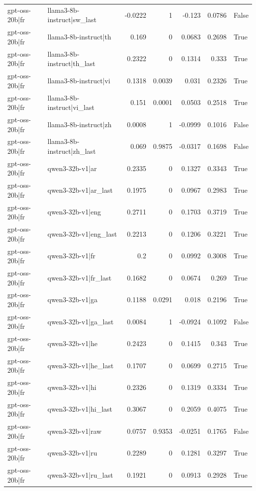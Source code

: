\begin{table}
\begin{tabular}{l l r r r r l}
gpt-oss-20b|fr & llama3-8b-instruct|sw_last & -0.0222 & 1 & -0.123 & 0.0786 & False \\
gpt-oss-20b|fr & llama3-8b-instruct|th & 0.169 & 0 & 0.0683 & 0.2698 & True \\
gpt-oss-20b|fr & llama3-8b-instruct|th_last & 0.2322 & 0 & 0.1314 & 0.333 & True \\
gpt-oss-20b|fr & llama3-8b-instruct|vi & 0.1318 & 0.0039 & 0.031 & 0.2326 & True \\
gpt-oss-20b|fr & llama3-8b-instruct|vi_last & 0.151 & 0.0001 & 0.0503 & 0.2518 & True \\
gpt-oss-20b|fr & llama3-8b-instruct|zh & 0.0008 & 1 & -0.0999 & 0.1016 & False \\
gpt-oss-20b|fr & llama3-8b-instruct|zh_last & 0.069 & 0.9875 & -0.0317 & 0.1698 & False \\
gpt-oss-20b|fr & qwen3-32b-v1|ar & 0.2335 & 0 & 0.1327 & 0.3343 & True \\
gpt-oss-20b|fr & qwen3-32b-v1|ar_last & 0.1975 & 0 & 0.0967 & 0.2983 & True \\
gpt-oss-20b|fr & qwen3-32b-v1|eng & 0.2711 & 0 & 0.1703 & 0.3719 & True \\
gpt-oss-20b|fr & qwen3-32b-v1|eng_last & 0.2213 & 0 & 0.1206 & 0.3221 & True \\
gpt-oss-20b|fr & qwen3-32b-v1|fr & 0.2 & 0 & 0.0992 & 0.3008 & True \\
gpt-oss-20b|fr & qwen3-32b-v1|fr_last & 0.1682 & 0 & 0.0674 & 0.269 & True \\
gpt-oss-20b|fr & qwen3-32b-v1|ga & 0.1188 & 0.0291 & 0.018 & 0.2196 & True \\
gpt-oss-20b|fr & qwen3-32b-v1|ga_last & 0.0084 & 1 & -0.0924 & 0.1092 & False \\
gpt-oss-20b|fr & qwen3-32b-v1|he & 0.2423 & 0 & 0.1415 & 0.343 & True \\
gpt-oss-20b|fr & qwen3-32b-v1|he_last & 0.1707 & 0 & 0.0699 & 0.2715 & True \\
gpt-oss-20b|fr & qwen3-32b-v1|hi & 0.2326 & 0 & 0.1319 & 0.3334 & True \\
gpt-oss-20b|fr & qwen3-32b-v1|hi_last & 0.3067 & 0 & 0.2059 & 0.4075 & True \\
gpt-oss-20b|fr & qwen3-32b-v1|raw & 0.0757 & 0.9353 & -0.0251 & 0.1765 & False \\
gpt-oss-20b|fr & qwen3-32b-v1|ru & 0.2289 & 0 & 0.1281 & 0.3297 & True \\
gpt-oss-20b|fr & qwen3-32b-v1|ru_last & 0.1921 & 0 & 0.0913 & 0.2928 & True \\

\end{tabular}
\end{table}
